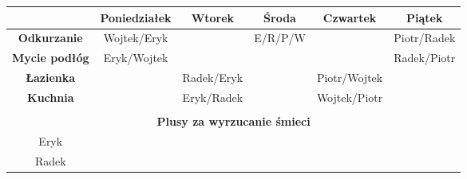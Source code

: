 \documentclass[a4paper, 11pt]{article}
\begin{document}
\begin{table}[ht]
\begin{tabular}{|c|c|c|c|c|c|c|c|c|c|c|c|c|c|c|c|c|c|c|c|c|c|c|c|c|c|c|c|c|c|}
\hline
\multicolumn{5}{|p{3cm}||}{ } & \multicolumn{5}{|p{3cm}|}{\textbf{Poniedziałek}} & \multicolumn{5}{|p{3cm}|}{\textbf{Wtorek}} & \multicolumn{5}{|p{3cm}|}{\textbf{Środa}} & \multicolumn{5}{|p{3cm}|}{\textbf{Czwartek}} & \multicolumn{5}{|p{3cm}|}{\textbf{Piątek}} \\
\hline
\hline
\multicolumn{5}{|p{3cm}||}{\textbf{Odkurzanie}} & \multicolumn{5}{|p{3cm}|}{Wojtek/Eryk} & \multicolumn{5}{|p{3cm}|}{}& \multicolumn{5}{|p{3cm}|}{E/R/P/W} & \multicolumn{5}{|p{3cm}|}{} & \multicolumn{5}{|p{3cm}|}{Piotr/Radek} \\
\hline
\multicolumn{5}{|p{3cm}||}{\textbf{\textbf{Mycie podłóg}}} & \multicolumn{5}{|p{3cm}|}{Eryk/Wojtek} & \multicolumn{5}{|p{3cm}|}{}& \multicolumn{5}{|p{3cm}|}{} & \multicolumn{5}{|p{3cm}|}{} & \multicolumn{5}{|p{3cm}|}{Radek/Piotr} \\
\hline
\multicolumn{5}{|p{3cm}||}{\textbf{\textbf{Łazienka}}} & \multicolumn{5}{|p{3cm}|}{} & \multicolumn{5}{|p{3cm}|}{Radek/Eryk}& \multicolumn{5}{|p{3cm}|}{} & \multicolumn{5}{|p{3cm}|}{Piotr/Wojtek} & \multicolumn{5}{|p{3cm}|}{} \\
\hline
\multicolumn{5}{|p{3cm}||}{\textbf{\textbf{Kuchnia}}} & \multicolumn{5}{|p{3cm}|}{} & \multicolumn{5}{|p{3cm}|}{Eryk/Radek}& \multicolumn{5}{|p{3cm}|}{} & \multicolumn{5}{|p{3cm}|}{Wojtek/Piotr} & \multicolumn{5}{|p{3cm}|}{} \\
\hline
\multicolumn{30}{p{3cm}}{}\\
\hline
\multicolumn{30}{|p{18cm}|}{\centering\textbf{Plusy za wyrzucanie śmieci}}\\
\hline
\multicolumn{5}{|p{3cm}||}{Eryk} & \multicolumn{1}{|p{2,6mm}|}{} & \multicolumn{1}{|p{2,6mm}|}{} & \multicolumn{1}{|p{2,6mm}|}{} & \multicolumn{1}{|p{2,6mm}|}{} & & \multicolumn{1}{||p{2,6mm}|}{} & \multicolumn{1}{|p{2,6mm}|}{} & \multicolumn{1}{|p{2,6mm}|}{} & \multicolumn{1}{|p{2,6mm}|}{} & & \multicolumn{1}{||p{2,6mm}|}{} & \multicolumn{1}{|p{2,6mm}|}{} & \multicolumn{1}{|p{2,6mm}|}{} & \multicolumn{1}{|p{2,6mm}|}{} & & \multicolumn{1}{||p{2,6mm}|}{} & \multicolumn{1}{|p{2,6mm}|}{} & \multicolumn{1}{|p{2,6mm}|}{} & \multicolumn{1}{|p{2,6mm}|}{} & &\multicolumn{1}{||p{2,6mm}|}{} & \multicolumn{1}{|p{2,6mm}|}{} & \multicolumn{1}{|p{2,6mm}|}{} & \multicolumn{1}{|p{2,6mm}|}{} &\\
\hline
\multicolumn{5}{|p{3cm}||}{Radek} & \multicolumn{1}{|p{2,6mm}|}{} & \multicolumn{1}{|p{2,6mm}|}{} & \multicolumn{1}{|p{2,6mm}|}{} & \multicolumn{1}{|p{2,6mm}|}{} & & \multicolumn{1}{||p{2,6mm}|}{} & \multicolumn{1}{|p{2,6mm}|}{} & \multicolumn{1}{|p{2,6mm}|}{} & \multicolumn{1}{|p{2,6mm}|}{} & & \multicolumn{1}{||p{2,6mm}|}{} & \multicolumn{1}{|p{2,6mm}|}{} & \multicolumn{1}{|p{2,6mm}|}{} & \multicolumn{1}{|p{2,6mm}|}{} & & \multicolumn{1}{||p{2,6mm}|}{} & \multicolumn{1}{|p{2,6mm}|}{} & \multicolumn{1}{|p{2,6mm}|}{} & \multicolumn{1}{|p{2,6mm}|}{} & &\multicolumn{1}{||p{2,6mm}|}{} & \multicolumn{1}{|p{2,6mm}|}{} & \multicolumn{1}{|p{2,6mm}|}{} & \multicolumn{1}{|p{2,6mm}|}{} &\\

\end{tabular}
\end{table}
\end{document}

